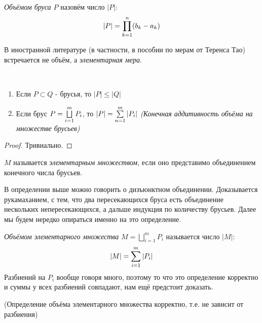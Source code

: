 \begin{definition}
	\textit{Объёмом бруса $P$} назовём число $|P|$:
	\[
		|P| = \prod\limits_{k = 1}^n (b_k - a_k)
	\]
\end{definition}

\begin{anote}
	В иностранной литературе (в частности, в пособии по мерам от Теренса Тао) встречается не объём, а \textit{элементарная мера}.
\end{anote}

\begin{proposition}~
	\begin{enumerate}
		\item Если $P \subset Q$ - брусья, то $|P| \le |Q|$
		
		\item Если брус $P = \bigsqcup\limits_{i = 1}^m P_i$, то $|P| = \sum\limits_{n = 1}^m |P_i|$ \textit{(Конечная аддитивность объёма на множестве брусьев)}
	\end{enumerate}
\end{proposition}

\begin{proof}
	Тривиально.
\end{proof}

\begin{definition}
	$M$ называется \textit{элементарным множеством}, если оно представимо объединением конечного числа брусьев.
\end{definition}

\begin{note}
	В определении выше можно говорить о дизъюнктном объединении. Доказывается рукамаханием, с тем, что два пересекающихся бруса есть объединение нескольких непересекающихся, а дальше индукция по количеству брусьев. Далее мы будем нередко опираться именно на это определение.
\end{note}

\begin{definition}
	\textit{Объёмом элементарного множества} $M = \bigsqcup\limits_{i = 1}^m P_i$ называется число $|M|$:
	\[
		|M| = \sum\limits_{i = 1}^m |P_i|
	\]
	Разбиений на $P_i$ вообще говоря много, поэтому то что это определение корректно и суммы у всех разбиений совпадают, нам ещё предстоит доказать.
\end{definition}

\begin{theorem}
	(Определение объёма элементарного множества корректно, т.е. не зависит от разбиения)
\end{theorem}


